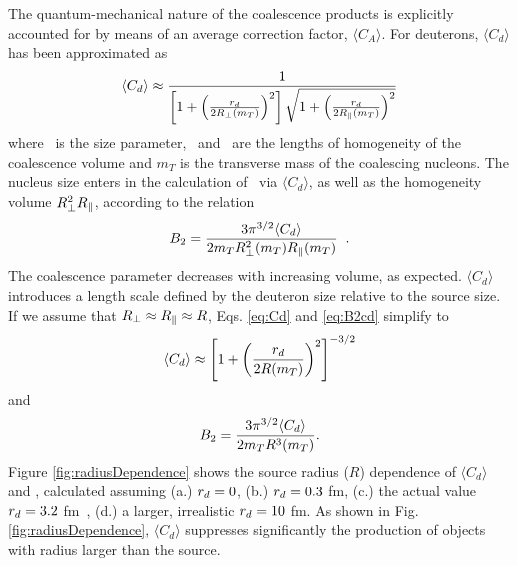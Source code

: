 \documentclass[%
 reprint,
 amsmath,amssymb,
 aps,
]{revtex4-1}
\begin{document}
The quantum-mechanical nature of the coalescence products is explicitly accounted for by means of an average correction factor, $\langle C_{A} \rangle$. For deuterons, $\langle C_{d} \rangle$ has been approximated as 
%
\begin{equation}
\langle C_{d} \rangle \approx \frac{1}{\left[1+ \left(\frac{r_{d}}{2R_{\perp}(m_{T})}\right)^{2}\right] \sqrt{1+ \left(\frac{r_{d}}{2R_{\|}(m_{T})}\right)^{2}}}
\label{eq:Cd}
\end{equation}
%
where \dradius~is the size parameter, \rperp~and \rpar~are the lengths of homogeneity of the coalescence volume and $m_{T}$ is the transverse mass of the coalescing nucleons.
The nucleus size enters in the  calculation of \btwo~via $\langle C_{d} \rangle$, as well as the homogeneity volume $R_{\perp}^{2}R_{\|}$, according to the relation~\cite{Scheibl:1998tk}
%
\begin{equation}
B_{2} = \frac{3\pi^{3/2} \langle C_{d} \rangle}{2m_{T}R_{\perp}^{2}(m_{T})R_{\|}(m_{T})} \;\; .
\label{eq:B2cd}
\end{equation}
%
The coalescence parameter decreases with increasing volume, as expected. 
$\langle C_{d} \rangle$ introduces a length scale defined by the deuteron size relative to the source size. 
If we assume that  $R_{\perp} \approx R_{\|} \approx R$, Eqs. \ref{eq:Cd} and \ref{eq:B2cd} simplify to 
%
\begin{equation}
\langle C_{d} \rangle \approx \left[1+ \left(\frac{r_{d}}{2R(m_{T})}\right)^{2}\right]^{-3/2}
\label{eq:Cdapprox}
\end{equation}
%
and
%
\begin{equation}
B_{2} = \frac{3\pi^{3/2} \langle C_{d} \rangle}{2m_{T}R^{3}(m_{T})}.
\label{eq:B2approx}
\end{equation}
%
Figure \ref{fig:radiusDependence} shows the source radius ($R$) dependence of $\langle C_{d} \rangle$ and \btwo, calculated assuming (a.) $r_{d} = 0$, (b.) $r_{d} = 0.3$ fm, (c.) the actual value $r_{d} = 3.2$ fm~\cite{Mohr:2015ccw}, (d.) a larger, irrealistic $r_{d} = 10$ fm. 
As shown in Fig. \ref{fig:radiusDependence}, $\langle C_{d} \rangle$ suppresses significantly the production of objects with radius larger than the source. 
\end{document}
